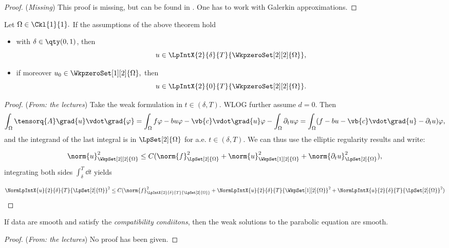 \begin{proof}(\textit{Missing})
	This proof is missing, but can be found in \cite{bulicekPartialDifferentialEquations2019a}.  One has to work with Galerkin approximations.
\end{proof}


\begin{theorem}
	Let $\Omega \in \Ckl{1}{1}.$ If the assumptions of the above theorem hold

	\begin{itemize}
		\item with $\delta \in \qty(0,1)$, then
			\[
				u \in \LpIntX{2}{\delta}{T}{\WkpzeroSet[2][2]{\Omega}},
			\]
		\item if moreover $u_0 \in \WkpzeroSet[1][2]{\Omega},$ then
			\[
				u \in \LpIntX{2}{0}{T}{\WkpzeroSet[2][2]{\Omega}}.
			\]
	\end{itemize}
\end{theorem}

\begin{proof}(\textit{From: the lectures})
	Take the weak formulation in $t \in (\delta,T)$. WLOG further assume $d=0$. Then
	\begin{equation*}
		\int_{\Omega} \tensorq{A} \grad{u} \vdot \grad{\varphi}  = \int_{\Omega}f \varphi - bu \varphi - \vb{c}\vdot \grad{u} \varphi - \int_{\Omega} \partial_t u \varphi = \int_{\Omega}(f-bu-\vb{c}\vdot \grad{u} - \partial_t u) \varphi,
	\end{equation*}
	and the integrand of the last integral is in $\LpSet[2]{\Omega}$ for a.e. $t \in (\delta,T)$. We can thus use the elliptic regularity results and write:

	\begin{equation*}
		\norm{u}_{\WkpSet[2][2]{\Omega}}^{2} \leq C(\norm{f}_{\LpSet[2]{\Omega}}^{2} + \norm{u}_{\WkpSet[1][2]{\Omega}}^{2} + \norm{\partial_t u}_{\LpSet[2]{\Omega}}^{2}),
	\end{equation*}
	integrating both sides $\int_{\delta}^T \dd{t}$ yields

	\begin{equation*}
		\NormLpIntX{u}{2}{\delta}{T}{\LpSet[2]{\Omega}}^{2} \leq C(\norm{f}_{\LpIntX{2}{\delta}{T}{\LpSet[2]{\Omega}}}^{2} + \NormLpIntX{u}{2}{\delta}{T}{\WkpSet[1][2]{\Omega}} ^{2} + \NormLpIntX{u}{2}{\delta}{T}{\LpSet[2]{\Omega}}^{2})
	\end{equation*}
\end{proof}

\begin{theorem}
	If data are smooth and satisfy the \textit{compatibility condiitons}, then the weak solutions to the parabolic equation are smooth.
\end{theorem}
\begin{proof}(\textit{From: the lectures})
	No proof has been given.
\end{proof}

